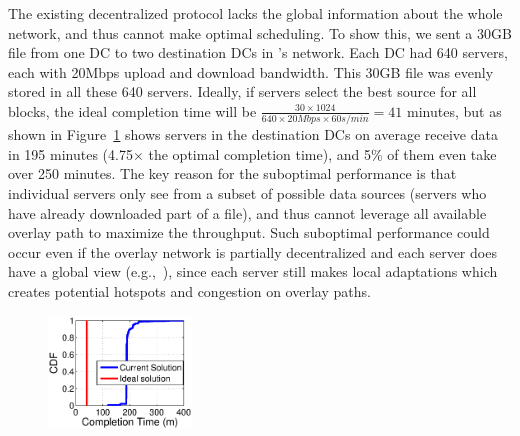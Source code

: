 The existing decentralized protocol lacks the global information
about the whole network, and thus cannot make optimal scheduling.
To show this, we sent a 30GB file from one DC to two destination
DCs in \company's network.
Each DC had 640 servers, each with 20Mbps upload and download
bandwidth. This 30GB file was evenly stored in all these
640 servers.
Ideally, if servers select
the best source for all blocks, the ideal
completion time will be
$\frac{30\times 1024}{640\times 20Mbps \times 60s/min} = 41$
minutes, but as shown in Figure~\ref{fig:motivation} shows
servers in the destination DCs on average receive data in
195 minutes (4.75$\times$ the optimal completion
time), and 5\% of them even take over 250 minutes.
The key reason for the suboptimal performance is that
individual servers only see from a subset of possible data sources
(servers who have already downloaded part of a file),
and thus cannot leverage all available overlay path to
maximize the throughput.
Such suboptimal performance
could occur even if the overlay
network is partially decentralized and each server does have a
global view (e.g.,~\cite{Huang2014A}),
since each server still makes local adaptations which creates potential
hotspots and congestion on overlay paths.


\begin{figure}[t]
  \centering
  \includegraphics[width=1.5in]{images/SEvsIdeal.eps}
  \vspace{-0.2cm}
  \label{fig:motivation}
\vspace{-0.4cm}
\end{figure}


